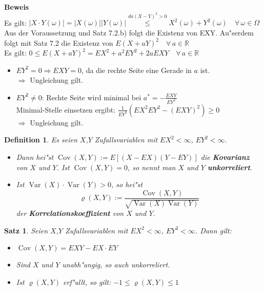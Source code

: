 \documentclass[a4paper,11pt]{book}
\newcommand{\R}{{\mathbb R}}
\DeclareMathOperator{\var}{Var}
\DeclareMathOperator{\cov}{Cov}
\newtheorem{Def}{Definition}[chapter]
\newtheorem{Sa}{Satz}[chapter]
\theoremstyle{nonumberplain}
\begin{document}
\textbf{Beweis}\\
Es gilt: $|X\cdot Y(\omega)|=|X(\omega)||Y(\omega)|\stackrel{da(X-Y)^2>0}{\leq}X^2(\omega)+Y^2(\omega)\quad \forall\,\omega\in\Omega$\\
Aus der Voraussetzung und Satz 7.2.b) folgt die Existenz von EXY. Au"serdem folgt mit Satz 7.2 die Existenz von $E(X+aY)^2\quad \forall\,a\in\R$\\
Es gilt: $0\leq E(X+aY)^2=EX^2+a^2EY^2+2aEXY \quad \forall\, a\in\R$
\begin{itemize}
\item [1.Fall:] $EY^2=0 \Rightarrow EXY=0$, da die rechte Seite eine Gerade in $a$ ist.\\
$\Rightarrow $ Ungleichung gilt.
\item [2.Fall:] $EY^2\neq 0$: Rechte Seite wird minimal bei $a^*=-\frac{EXY}{EY^2}$ \\
Minimal-Stelle einsetzen ergibt: $\frac{1}{EY^2}(EX^2EY^2-(EXY)^2)\geq 0$\\
$\Rightarrow $ Ungleichung gilt.
\end{itemize}

\begin{Def}
Es seien $X$,$Y$ Zufallsvariablen mit $EX^2<\infty$, $EY^2<\infty$.
\begin{itemize}
\item [a)] Dann hei"st $\cov (X,Y):=E[(X-EX)(Y-EY)]$ die \textbf{Kovarianz} von $X$ und $Y$. Ist $\cov (X,Y)=0$, so nennt man $X$ und $Y$ \textbf{unkorreliert}.
\item [b)] Ist $\var(X)\cdot \var(Y)>0$, so hei"st
\[\varrho(X,Y):=\frac{\cov (X,Y)}{\sqrt{\var(X)\var(Y)}}\]
der \textbf{Korrelationskoeffizient} von $X$ und $Y$.
\end{itemize}
\end{Def}

\begin{Sa}
Seien $X$,$Y$ Zufallsvariablen mit $EX^2<\infty$, $EY^2<\infty$. Dann gilt:
\begin{itemize}
\item [a)] $\cov (X,Y)=EXY-EX\cdot EY$
\item [b)] Sind $X$ und $Y$ unabh"angig, so auch unkorreliert.
\item [c)] Ist $\varrho (X,Y)$ erf"ullt, so gilt: $-1\leq \varrho (X,Y)\leq 1$
\end{itemize}
\end{Sa}
\end{document}
